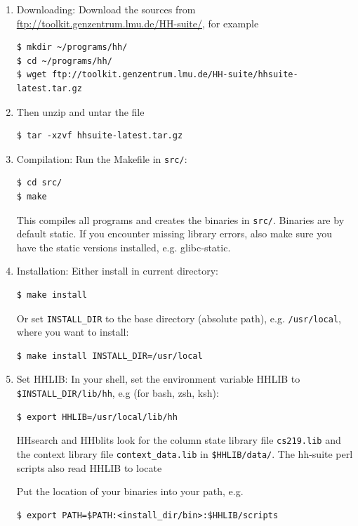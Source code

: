 \documentclass[11pt,a4paper]{article}
\begin{document}
\begin{enumerate}
\item Downloading: Download the sources from \url{ftp://toolkit.genzentrum.lmu.de/HH-suite/}, for example

\begin{verbatim}
$ mkdir ~/programs/hh/
$ cd ~/programs/hh/
$ wget ftp://toolkit.genzentrum.lmu.de/HH-suite/hhsuite-latest.tar.gz
\end{verbatim}

\item Then unzip and untar the file
\begin{verbatim}
$ tar -xzvf hhsuite-latest.tar.gz
\end{verbatim}

\item Compilation: Run the Makefile in \verb`src/`:
\begin{verbatim}
$ cd src/
$ make
\end{verbatim}

This compiles all programs and creates the binaries in \verb`src/`. Binaries are by default static. If you encounter
missing library errors, also make sure you have the static versions installed, e.g. glibc-static.

\item Installation: Either install in current directory:

\begin{verbatim}
$ make install
\end{verbatim}

Or set \verb`INSTALL_DIR` to the base directory (absolute path), e.g. \verb`/usr/local`, where you want to install:

\begin{verbatim}
$ make install INSTALL_DIR=/usr/local
\end{verbatim}

\item Set HHLIB: In your shell, set the environment variable HHLIB to \verb`$INSTALL_DIR/lib/hh`, 
e.g (for bash, zsh, ksh):
\begin{verbatim}
$ export HHLIB=/usr/local/lib/hh
\end{verbatim}
HHsearch and HHblits look for the column state library file \verb`cs219.lib`
and the context library file \verb`context_data.lib` in \verb`$HHLIB/data/`. The hh-suite
perl scripts also read HHLIB to locate 

Put the location of your binaries into your path, e.g.
\begin{verbatim}
$ export PATH=$PATH:<install_dir/bin>:$HHLIB/scripts
\end{verbatim}


\end{enumerate}
\end{document}
